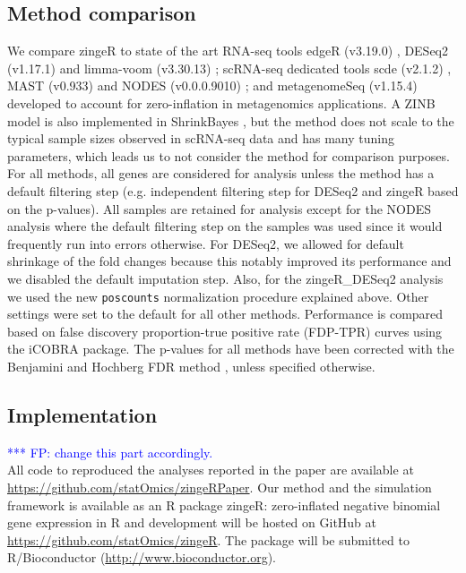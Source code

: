 \documentclass{bmcart}
\newcommand{\fanny}[1]{\textcolor{blue}{*** FP: #1}}
\begin{document}
\subsection*{Method comparison}
We compare zingeR to state of the art RNA-seq tools edgeR (v3.19.0) \cite{Robinson2010a,McCarthy2012a}, DESeq2 (v1.17.1) \cite{Love2014} and limma-voom (v3.30.13) \cite{Law2014}; scRNA-seq dedicated tools scde (v2.1.2) \cite{Kharchenko2014}, MAST (v0.933) \cite{Finak2015} and NODES (v0.0.0.9010) \cite{Sengupta2016}; and metagenomeSeq (v1.15.4) \cite{Paulson2013} developed to account for zero-inflation in metagenomics applications. 
A ZINB model is also implemented in ShrinkBayes \cite{VandeWiel2014}, but the method does not scale to the typical sample sizes observed in scRNA-seq data and has many tuning parameters, which leads us to not consider the method for comparison purposes. 
For all methods, all genes are considered for analysis unless the method has a default filtering step (e.g. independent filtering step for DESeq2 and zingeR based on the p-values). All samples are retained for analysis except for the NODES analysis where the default filtering step on the samples was used since it would frequently run into errors otherwise. For DESeq2, we allowed for default shrinkage of the fold changes because this notably improved its performance and we disabled the default imputation step.
Also, for the zingeR\_DESeq2 analysis we used the new \texttt{poscounts} normalization procedure explained above.
Other settings were set to the default for all other methods.
Performance is compared based on false discovery proportion-true positive rate (FDP-TPR) curves using the iCOBRA package\cite{Soneson2016b}.
The p-values for all methods have been corrected with the Benjamini and Hochberg FDR method \cite{Benjamini1995}, unless specified otherwise.

\subsection*{Implementation} 

\fanny{change this part accordingly.}\\
All code to reproduced the analyses reported in the paper are available at \url{https://github.com/statOmics/zingeRPaper}.
Our method and the simulation framework is available as an R package zingeR: zero-inflated negative binomial gene expression in R and development will be hosted on GitHub at \url{https://github.com/statOmics/zingeR}.
The package will be submitted to R/Bioconductor (\url{http://www.bioconductor.org}).
\end{document}

